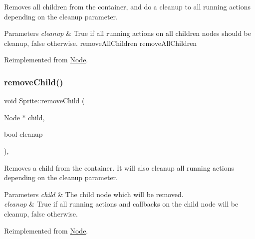 Removes all children from the container, and do a cleanup to all running actions depending on the cleanup parameter.


\begin{DoxyParams}{Parameters}
{\em cleanup} & True if all running actions on all children nodes should be cleanup, false otherwise.  remove\+All\+Children  remove\+All\+Children \\
\hline
\end{DoxyParams}


Reimplemented from \hyperlink{classNode_aca66e2b385c3dbf1a6f55627c4a13192}{Node}.

\mbox{\label{classSprite_a64aee8360870f15193ad46565565a0f2}} 
\subsubsection{\texorpdfstring{remove\+Child()}{removeChild()}\hspace{0.1cm}{\footnotesize\ttfamily [1/2]}}
{\footnotesize\ttfamily void Sprite\+::remove\+Child (\begin{DoxyParamCaption}\item[{\hyperlink{classNode}{Node} $\ast$}]{child,  }\item[{bool}]{cleanup }\end{DoxyParamCaption})\hspace{0.3cm}{\ttfamily [override]}, {\ttfamily [virtual]}}

Removes a child from the container. It will also cleanup all running actions depending on the cleanup parameter.


\begin{DoxyParams}{Parameters}
{\em child} & The child node which will be removed. \\
\hline
{\em cleanup} & True if all running actions and callbacks on the child node will be cleanup, false otherwise. \\
\hline
\end{DoxyParams}


Reimplemented from \hyperlink{classNode_a872d4a7d389b26b0c6ad7ed99c8b1b65}{Node}.

\mbox{\label{classSprite_a84cbb6f523e114e8d5c5767ec7796111}} 
